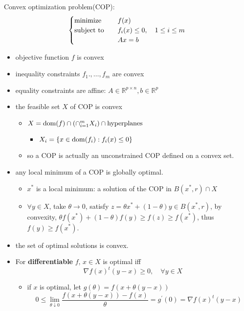 \begin{remark}
    Convex optimization problem(COP):
    \[\begin{cases}
        \operatorname{minimize} \quad &f(x)\\
        \operatorname{subject\ to} \quad &f_i(x) \le 0, \quad 1 \le i \le m\\
        &Ax = b
    \end{cases}\]
    \begin{itemize}
        \item objective function $f$ is convex
        \item inequality constraints $f_1., \dots, f_m$ are convex
        \item equality constraints are affine: $A \in \mathbb{R}^{p \times n}, b \in \mathbb{R}^p$
        \item the feasible set $X$ of COP is convex \begin{itemize}
            \item $X = \operatorname{dom}(f) \cap (\cap_{i = 1}^m X_i) \cap \text{hyperplanes}$ \begin{itemize}
                \item $X_i = \left\{x \in \operatorname{dom}(f_i): f_i(x) \le 0\right\}$
            \end{itemize}
            \item so a COP is actually an unconstrained COP defined on a convex set. 
        \end{itemize}
        \item any local minimum of a COP is globally optimal.\begin{itemize}
            \item $x^*$ is a local minimum: a solution of the COP in $B(x^*, r) \cap X$
            \item $\forall y \in X$, take $\theta \to 0$, satisfy $z = \theta x^* + (1 - \theta)y \in B(x^*, r)$, by convexity, $\theta f(x^*) + (1 - \theta)f(y) \ge f(z) \ge f(x^*)$, thus $f(y) \ge f(x^*)$.
        \end{itemize}
        \item the set of optimal solutions is convex.
        \item For \textbf{differentiable} $f$, $x \in X$ is optimal iff \[\nabla f(x)^t(y - x) \ge 0, \quad \forall y \in X\]
            \begin{itemize}
                \item if $x$ is optimal, let  $g(\theta) = f(x + \theta(y - x))$ \[0 \leq \lim _{\theta \downarrow 0} \frac{f(x+\theta(y-x))-f(x)}{\theta}=g^{\prime}(0)=\nabla f(x)^{t}(y-x)\]

\end{itemize}
\end{itemize}
\end{remark}
